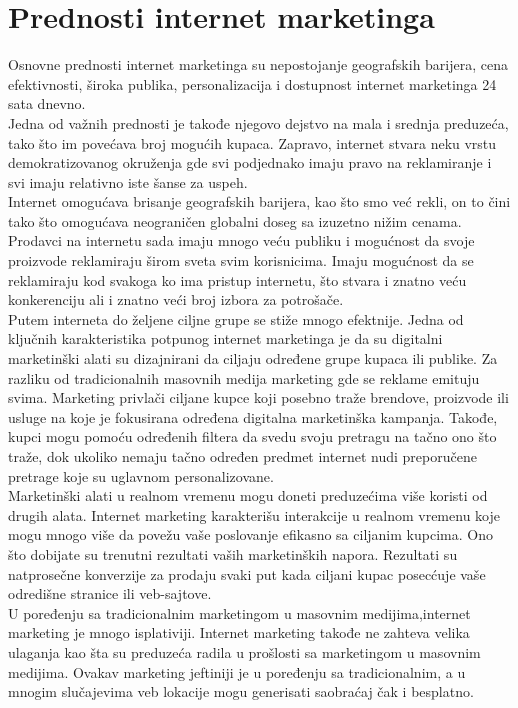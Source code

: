 \documentclass[a4paper]{article}
\begin{document}
{\section{Prednosti internet marketinga}
\label{sec:prednosti}
Osnovne prednosti internet marketinga su nepostojanje geografskih barijera, cena efektivnosti, široka publika, personalizacija i dostupnost internet marketinga 24 sata dnevno.\\
Jedna od važnih prednosti je takođe njegovo dejstvo na mala i srednja preduzeća, tako što im povećava broj mogućih kupaca. Zapravo, internet stvara neku vrstu demokratizovanog okruženja gde svi podjednako imaju pravo na reklamiranje i svi imaju relativno iste šanse za uspeh.\\
Internet omogućava brisanje geografskih barijera, kao što smo već rekli, on to čini tako što omogućava neograničen globalni doseg sa izuzetno nižim cenama. Prodavci na internetu sada imaju mnogo veću publiku i mogućnost da svoje proizvode reklamiraju širom sveta svim korisnicima. Imaju mogućnost da se reklamiraju kod svakoga ko ima pristup internetu, što stvara i znatno veću konkerenciju ali i znatno veći broj izbora za potrošače.\\
Putem interneta do željene ciljne grupe se stiže mnogo efektnije.
Jedna od ključnih karakteristika potpunog internet marketinga je da su digitalni marketinški alati su dizajnirani da ciljaju određene grupe kupaca ili publike. Za razliku od tradicionalnih masovnih medija marketing gde se reklame emituju svima. Marketing privlači ciljane kupce koji posebno traže brendove, proizvode ili usluge na koje je fokusirana određena digitalna marketinška kampanja. Takođe, kupci mogu pomoću određenih filtera da svedu svoju pretragu na tačno ono što traže, dok ukoliko nemaju tačno određen predmet internet nudi preporučene pretrage koje su uglavnom personalizovane.\\
Marketinški alati u realnom vremenu mogu doneti preduze\'{c}ima više koristi od drugih alata. Internet marketing karakterišu interakcije u realnom vremenu koje mogu mnogo više da povežu vaše poslovanje efikasno sa ciljanim kupcima. Ono što dobijate su trenutni rezultati vaših marketinških napora. Rezultati su natprosečne konverzije za prodaju svaki put kada ciljani kupac posec\'{c}uje vaše odredišne stranice ili veb-sajtove.\\
U poređenju sa tradicionalnim marketingom u masovnim medijima,internet marketing je mnogo isplativiji. Internet marketing takođe ne zahteva  velika ulaganja kao šta su preduze\'{c}a radila u prošlosti sa marketingom u masovnim medijima. Ovakav marketing jeftiniji je u poređenju sa tradicionalnim, a u mnogim slučajevima veb lokacije mogu generisati saobra\'{c}aj čak i besplatno. 

}
\end{document}
